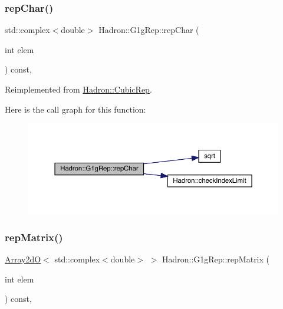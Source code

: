 \subsubsection{\texorpdfstring{repChar()}{repChar()}\hspace{0.1cm}{\footnotesize\ttfamily [2/2]}}
{\footnotesize\ttfamily std\+::complex$<$double$>$ Hadron\+::\+G1g\+Rep\+::rep\+Char (\begin{DoxyParamCaption}\item[{int}]{elem }\end{DoxyParamCaption}) const\hspace{0.3cm}{\ttfamily [inline]}, {\ttfamily [virtual]}}



Reimplemented from \mbox{\hyperlink{structHadron_1_1CubicRep_af45227106e8e715e84b0af69cd3b36f8}{Hadron\+::\+Cubic\+Rep}}.

Here is the call graph for this function\+:
\nopagebreak
\begin{figure}[H]
\begin{center}
\leavevmode
\includegraphics[width=350pt]{d4/d3c/structHadron_1_1G1gRep_aaf106033a828159337aed03c6489087f_cgraph}
\end{center}
\end{figure}
\mbox{\label{structHadron_1_1G1gRep_a0671004832091015635bb8565653340c}} 
\subsubsection{\texorpdfstring{repMatrix()}{repMatrix()}\hspace{0.1cm}{\footnotesize\ttfamily [1/2]}}
{\footnotesize\ttfamily \mbox{\hyperlink{classADAT_1_1Array2dO}{Array2dO}}$<$ std\+::complex$<$double$>$ $>$ Hadron\+::\+G1g\+Rep\+::rep\+Matrix (\begin{DoxyParamCaption}\item[{int}]{elem }\end{DoxyParamCaption}) const\hspace{0.3cm}{\ttfamily [inline]}, {\ttfamily [virtual]}}



